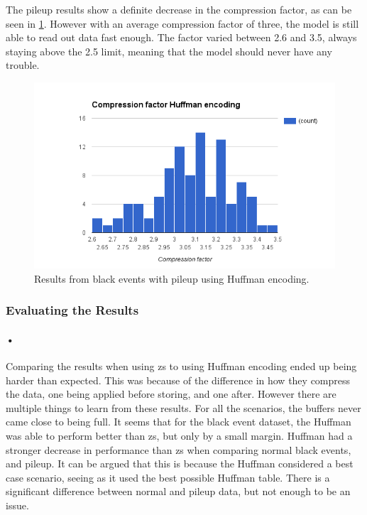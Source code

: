 \documentclass[a4paper, 12pt]{report}
\begin{document}
The pileup results show a definite decrease in the compression factor, as can be seen in \ref{fig:comp-huffman-pileup}.
However with an average compression factor of three, the model is still able to read out data fast enough.
The factor varied between 2.6 and 3.5, always staying above the 2.5 limit, meaning that the model should never have any trouble.

\begin{figure}[H]
	\centering
		\includegraphics[width=1.0\textwidth]{images/compression-factor-pileup-huffman.png}
		\caption{Results from black events with pileup using Huffman encoding.}
		\label{fig:comp-huffman-pileup}
\end{figure}

\subsubsection{Evaluating the Results}

\paragraph{•}
Comparing the results when using \gls{zs} to using Huffman encoding ended up being harder than expected.
This was because of the difference in how they compress the data, one being applied before storing, and one after.
However there are multiple things to learn from these results.
For all the scenarios, the buffers never came close to being full.
It seems that for the black event dataset, the Huffman was able to perform better than \gls{zs}, but only by a small margin.
Huffman had a stronger decrease in performance than \gls{zs} when comparing normal black events, and pileup.
It can be argued that this is because the Huffman considered a best case scenario, seeing as it used the best possible Huffman table.
There is a significant difference between normal and pileup data, but not enough to be an issue.
\end{document}
